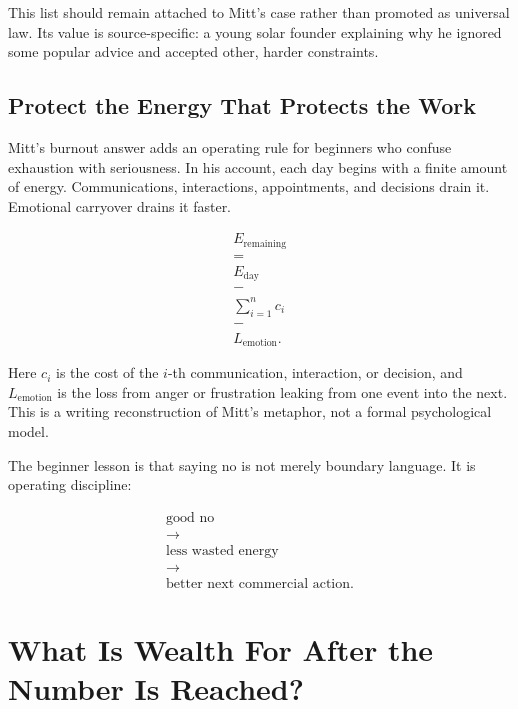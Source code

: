 \documentclass[11pt,oneside]{book}
\begin{document}
This list should remain attached to Mitt's case rather than promoted as universal law. Its value is source-specific: a young solar founder explaining why he ignored some popular advice and accepted other, harder constraints.

\section{Protect the Energy That Protects the Work}

Mitt's burnout answer adds an operating rule for beginners who confuse exhaustion with seriousness. In his account, each day begins with a finite amount of energy. Communications, interactions, appointments, and decisions drain it. Emotional carryover drains it faster.

\begin{equation}
\begin{gathered}
E_{\mathrm{remaining}}\\
=\\
E_{\mathrm{day}}\\
-\\
\sum_{i=1}^{n}c_i\\
-\\
L_{\mathrm{emotion}}.
\end{gathered}
\end{equation}

Here \(c_i\) is the cost of the \(i\)-th communication, interaction, or decision, and \(L_{\mathrm{emotion}}\) is the loss from anger or frustration leaking from one event into the next. This is a writing reconstruction of Mitt's metaphor, not a formal psychological model.

The beginner lesson is that saying no is not merely boundary language. It is operating discipline:

\begin{equation}
\begin{gathered}
\text{good no}\\
\longrightarrow\\
\text{less wasted energy}\\
\longrightarrow\\
\text{better next commercial action}.
\end{gathered}
\end{equation}

\chapter{What Is Wealth For After the Number Is Reached?}
\end{document}
